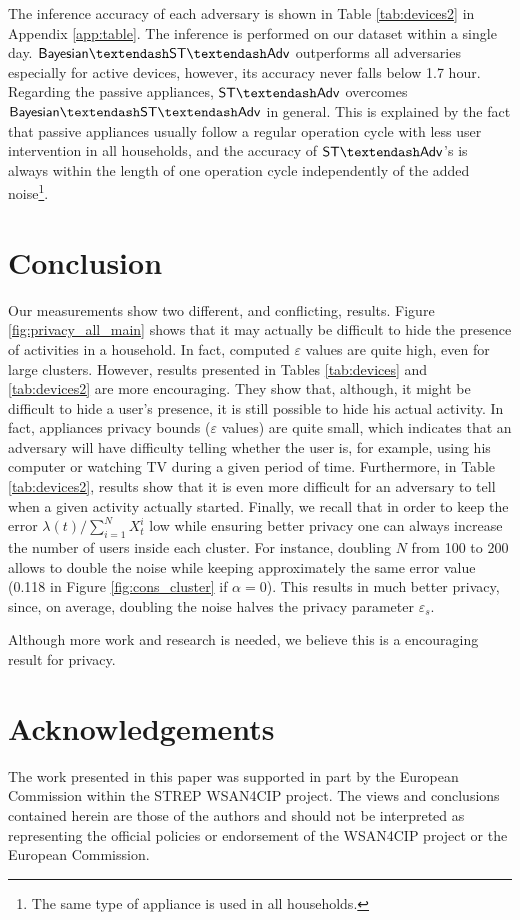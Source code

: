 \documentclass[11pt,a4paper]{article}
\theoremstyle{plain}
\theoremstyle{plain}
\theoremstyle{plain}
\theoremstyle{plain}
\theoremstyle{nonumberplain} \theoremseparator{}
\newcommand{\statadv}{\ensuremath{\mathsf{ST\textendash Adv}}\xspace}
\newcommand{\bstatadv}{\ensuremath{\mathsf{Bayesian\textendash ST\textendash Adv}}\xspace}
\begin{document}
The inference accuracy of each adversary is shown in Table \ref{tab:devices2} in Appendix \ref{app:table}. The inference is performed on our dataset within a single day.
\bstatadv outperforms all adversaries especially for active devices, however, its accuracy never falls below  1.7 hour. Regarding the passive appliances, \statadv overcomes \bstatadv in general. This is explained by the fact that passive appliances usually follow a regular operation cycle with less user intervention in all households, and the accuracy of \statadv 's is always within the length of one operation cycle independently of the added noise\footnote{The same type of appliance is used in all households.}. 





\section{Conclusion}
Our measurements show two different, and conflicting, results. Figure \ref{fig:privacy_all_main} shows that it may actually be 
difficult to hide the presence of activities in a household. 
In fact,  computed $\varepsilon$ values are quite high, even for large clusters. However, results presented
in Tables \ref{tab:devices} and \ref{tab:devices2}  are more encouraging. They show that, although, it might be difficult to hide a user's presence,
it is still possible to hide his actual activity. In fact, appliances privacy bounds ($\varepsilon$ values) are quite small, which indicates
that an adversary will have difficulty telling whether the user is, for example, using his computer or watching TV during a given period
of time. Furthermore, in Table \ref{tab:devices2}, results show that it is even more difficult for an adversary to tell when a given activity actually started. 
Finally, we recall that in order to keep the error $\lambda(t)/\sum_{i=1}^N X_{t}^i$ low while ensuring better privacy one can always 
increase the number of users inside each cluster. For instance, doubling $N$ from 100 to 200 allows to double the
noise while keeping approximately the same error value (0.118 in Figure \ref{fig:cons_cluster} if $\alpha=0$). 
This results in much better privacy, since, on average, doubling the noise halves the privacy parameter $\varepsilon_s$.    

Although more work and research is needed, we believe this is a encouraging  result for privacy. 



\section*{Acknowledgements}
The work presented in this paper was supported in part by the European 
Commission within the STREP WSAN4CIP project. The views and conclusions 
contained herein are those of the authors and should not be interpreted 
as representing the official policies or endorsement of the WSAN4CIP project 
or the European Commission.
\end{document}
